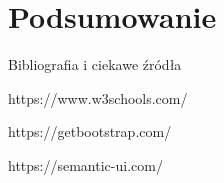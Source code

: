 \section{Podsumowanie}

\begin{frame}{Bibliografia i ciekawe źródła}
  
	\begin{thebibliography}{9}
	
		https://www.w3schools.com/
	
		https://getbootstrap.com/
	
		https://semantic-ui.com/
	
	\end{thebibliography}

\end{frame}


